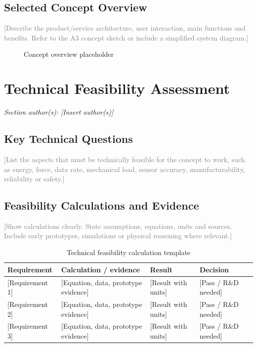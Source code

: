 \documentclass[11pt,a4paper]{article}
\newcommand{\placeholder}[1]{\textcolor{gray}{#1}}
\begin{document}
\subsection{Selected Concept Overview}
\placeholder{[Describe the product/service architecture, user interaction, main functions and benefits. Refer to the A3 concept sketch or include a simplified system diagram.]}

\begin{figure}[H]
\centering
{}
\caption{Concept overview placeholder}
\end{figure}

\section{Technical Feasibility Assessment}
\textit{Section author(s): [Insert author(s)]}

\subsection{Key Technical Questions}
\placeholder{[List the aspects that must be technically feasible for the concept to work, such as energy, force, data rate, mechanical load, sensor accuracy, manufacturability, reliability or safety.]}

\subsection{Feasibility Calculations and Evidence}
\placeholder{[Show calculations clearly. State assumptions, equations, units and sources. Include early prototypes, simulations or physical reasoning where relevant.]}

\begin{table}[H]
\centering
\caption{Technical feasibility calculation template}
\footnotesize
\begin{tabularx}{\textwidth}{Y Y L{3cm} L{3cm}}
\toprule
\textbf{Requirement} & \textbf{Calculation / evidence} & \textbf{Result} & \textbf{Decision} \\
\midrule
{}[Requirement 1] & [Equation, data, prototype evidence] & [Result with units] & [Pass / R\&D needed] \\
{}[Requirement 2] & [Equation, data, prototype evidence] & [Result with units] & [Pass / R\&D needed] \\
{}[Requirement 3] & [Equation, data, prototype evidence] & [Result with units] & [Pass / R\&D needed] \\
\bottomrule
\end{tabularx}
\end{table}
\end{document}
